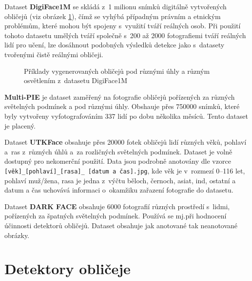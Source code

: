 Dataset \textbf{DigiFace1M} \cite{digiface1m} se skládá z~1 milionu snímků digitálně vytvořených obličejů (viz obrázek \ref{obrazek:digiface}), čímž se vyhýbá případným právním a etnickým problémům, které mohou být spojeny s~využití tváří reálných osob. Při použití tohoto datasetu umělých tváří společně s~200 až 2000 fotografiemi tváří reálných lidí pro učení, lze dosáhnout podobných výsledků detekce jako s~datasety tvořenými čistě reálnými obličeji.

\begin{figure}[H]
  \begin{center}
  \label{obrazek:digiface}
  \caption{Příklady vygenerovaných obličejů pod různými úhly a různým osvětlením z~datasetu DigiFace1M \cite{digiface1m}}
  \end{center}
\end{figure}

\textbf{Multi-PIE} \cite{multipie} je dataset zaměřený na fotografie obličejů pořízených za různých světelných podmínek a pod různými úhly. Obshauje přes 750000 snímků, které byly vytvořeny vyfotografováním 337 lidí po dobu několika měsíců. Tento dataset je placený.

Dataset \textbf{UTKFace} \cite{utkface} obsahuje přes 20000 fotek obličejů lidí různých věků, pohlaví a~ras z~různých úhlů a~za rozličných světelných podmínek. Dataset je volně dostupný pro nekomerční použití. Data jsou podrobně anotovány dle vzorce \texttt{[věk]\_[pohlaví]\_[rasa]\_
[datum a čas].jpg}, kde věk je v~rozmezí 0--116 let, pohlaví muž/žena, rasa je jedna z~výčtu běloch, černoch, asiat, ind, ostatní a datum a čas uchovává informaci o~okamžiku zařazení fotografie do datasetu.

Dataset \textbf{DARK FACE} \cite{darkFace} obsahuje 6000 fotografií různých prostředí s~lidmi, pořízených za špatných světelných podmínek. Používá se mj.při hodnocení účinnosti detektorů obličejů. Dataset obsahuje jak anotované tak neanotované obrázky.

\section{Detektory obličeje}
\label{sekce:NSdetektory}

